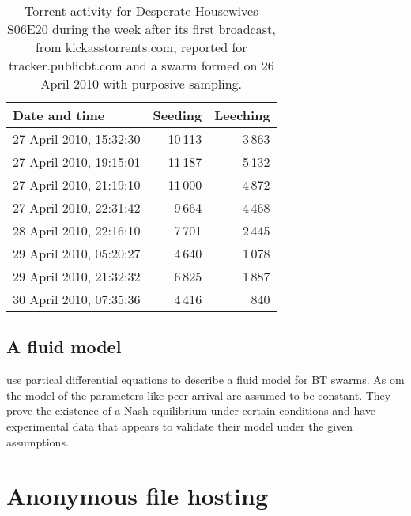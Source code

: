 \documentclass[12pt,english]{apa6}
\providecommand{\tabularnewline}{\\}
\begin{document}
\begin{table}
\begin{centering}
\begin{tabular}{lrr}
Date and time & Seeding & Leeching\tabularnewline
\hline 
27 April 2010, 15:32:30 & 10\,113 & 3\,863\tabularnewline
27 April 2010, 19:15:01  & 11\,187 & 5\,132\tabularnewline
27 April 2010, 21:19:10 & 11\,000 & 4\,872\tabularnewline
27 April 2010, 22:31:42 & 9\,664 & 4\,468\tabularnewline
28 April 2010, 22:16:10 & 7\,701 & 2\,445\tabularnewline
29 April 2010, 05:20:27 & 4\,640 & 1\,078\tabularnewline
29 April 2010, 21:32:32 & 6\,825 & 1\,887\tabularnewline
30 April 2010, 07:35:36 & 4\,416 & 840\tabularnewline
\end{tabular}
\par\end{centering}

\caption{\label{tab:Torrent-activity-for}Torrent activity for Desperate Housewives
S06E20 during the week after its first broadcast, from kickasstorrents.com,
reported for tracker.publicbt.com and a swarm formed on 26 April 2010
with purposive sampling.}


\end{table}



\subsection{A fluid model}

\citet{qiu_modeling_2004} use partical differential equations to
describe a fluid model for BT swarms. As om the model of \citet{menasche_content_2009}
the parameters like peer arrival are assumed to be constant. They
prove the existence of a Nash equilibrium under certain conditions
and have experimental data that appears to validate their model under
the given assumptions.


\section{Anonymous file hosting}
\end{document}
